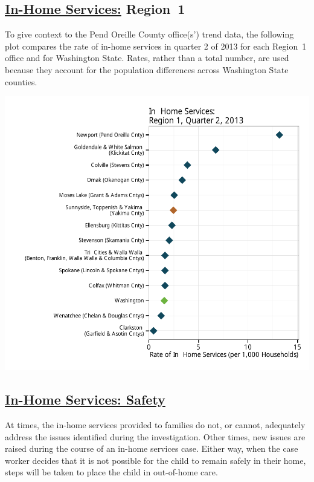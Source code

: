 \documentclass{article}\usepackage[]{graphicx}\usepackage[]{color}
\makeatletter
\def\maxwidth{ %
  \ifdim\Gin@nat@width>\linewidth
    \linewidth
  \else
    \Gin@nat@width
  \fi
}
\newenvironment{knitrout}{}{} %
\makeatother
\begin{document}
\subsection{\href{http://www.partnersforourchildren.org/child-well-being/visualizations/home-services/trends}
    {In-Home Services:} Region~1
}
To give context to the Pend Oreille County office(s') trend data, the following plot compares the rate of in-home services in quarter 2 of 2013 for each Region~1 office and for Washington State. Rates, rather than a total number, are used because they account for the population differences across Washington State counties.
\nopagebreak[3]
\begin{knitrout}
\color{fgcolor}

{\centering \includegraphics[width=\maxwidth]{figure/ihs_context} 

}



\end{knitrout}


\newpage

\subsection{\href{http://www.partnersforourchildren.org/child-well-being/visualizations/home-services/safety}
    {In-Home Services: Safety}
}
At times, the in-home services provided to families do not, or cannot, adequately address the issues identified during the investigation. Other times, new issues are raised during the course of an in-home services case. Either way, when the case worker decides that it is not possible for the child to remain safely in their home, steps will be taken to place the child in out-of-home care.
\end{document}
